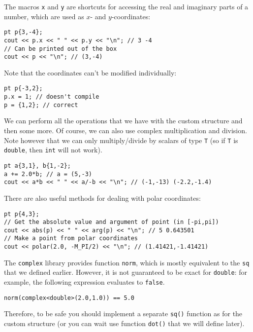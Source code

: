 The macros \lstinline|x| and \lstinline|y| are shortcuts for accessing the real and imaginary parts of a number, which are used as $x$- and $y$-coordinates:
\begin{lstlisting}
pt p{3,-4};
cout << p.x << " " << p.y << "\n"; // 3 -4
// Can be printed out of the box
cout << p << "\n"; // (3,-4)
\end{lstlisting}

Note that the coordinates can't be modified individually:
\begin{lstlisting}
pt p{-3,2};
p.x = 1; // doesn't compile
p = {1,2}; // correct
\end{lstlisting}

We can perform all the operations that we have with the custom structure and then some more. Of course, we can also use complex multiplication and division. Note however that we can only multiply/divide by scalars of type \lstinline|T| (so if \lstinline|T| is \lstinline|double|, then \lstinline|int| will not work).
\begin{lstlisting}
pt a{3,1}, b{1,-2};
a += 2.0*b; // a = (5,-3)
cout << a*b << " " << a/-b << "\n"; // (-1,-13) (-2.2,-1.4)
\end{lstlisting}

There are also useful methods for dealing with polar coordinates:
\begin{lstlisting}
pt p{4,3};
// Get the absolute value and argument of point (in [-pi,pi])
cout << abs(p) << " " << arg(p) << "\n"; // 5 0.643501
// Make a point from polar coordinates
cout << polar(2.0, -M_PI/2) << "\n"; // (1.41421,-1.41421)
\end{lstlisting}

\begin{warning}
The \lstinline|complex| library provides function \lstinline|norm|, which is mostly equivalent to the \lstinline|sq| that we defined earlier. However, it is not guaranteed to be exact for \lstinline|double|: for example, the following expression evaluates to \lstinline|false|.
\begin{lstlisting}
norm(complex<double>(2.0,1.0)) == 5.0
\end{lstlisting}

Therefore, to be safe you should implement a separate \lstinline|sq()| function as for the custom structure (or you can wait use function \lstinline|dot()| that we will define later).
\end{warning}
